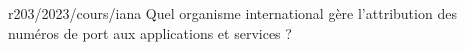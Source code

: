 \begin{question}{r203/2023/cours/iana}
  Quel organisme international gère l'attribution des numéros de port
  aux applications et services ?
  \begin{reponses}
  \end{reponses}
\end{question}
